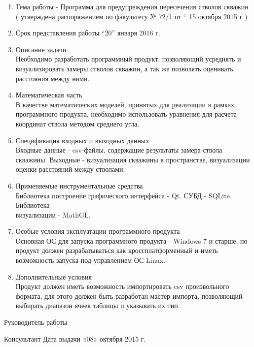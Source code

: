 \begin{titlepage}
\begin{enumerate}
  \item Тема работы - Программа для предупреждения пересечения стволов скважин\\
  ( утверждена  распоряжением  по  факультету  №  72/1    от “  15 октября   2015  г )
  \item Срок  представления  работы  “20”     января     2016  г.
  \item Описание задачи\\
    Необходимо разработать программный продукт, позволяющий усреднять и визуализировать замеры стволов скважин, а так же
    позволять оценивать расстояния между ними.
  \item Математическая часть\\
  В качестве математических моделей, принятых для реализации в рамках программного продукта,
  необходимо использовать уравнения для расчета координат ствола методом среднего угла.
  \item Спецификация входных и выходных данных\\
  Входные данные - csv-файлы, содержащие результаты замера ствола скважины. Выходные - визуализация скважины в пространстве, визуализации оценки расстояний
  между стволами.
  \item Применяемые инструментальные средства\\
  Библиотека построение графического интерфейса - Qt. СУБД - SQLite. Библиотека\\визуализации - MathGL.
  \item Особые условия эксплуатации программного продукта\\
  Основная ОС для запуска программного продукта - Windows 7 и старше, но продукт должен разрабатываться как кроссплатформенный и иметь возможность запуска
  под управлением ОС Linux.
  \item Дополнительные условия\\
  Продукт должен иметь возможность импортировать csv произвольного формата, для этого должен быть разработан мастер импорта, позволяющий
  выбирать диапазон ячеек таблицы и указывать их тип.
\end{enumerate}

\vspace{\fill}

Руководитель работы \underline{\hspace{5cm}}

Консультант \underline{\hspace{6.5cm}}
\center Дата  выдачи   «08»  октября       2015 г.
\end{titlepage}
